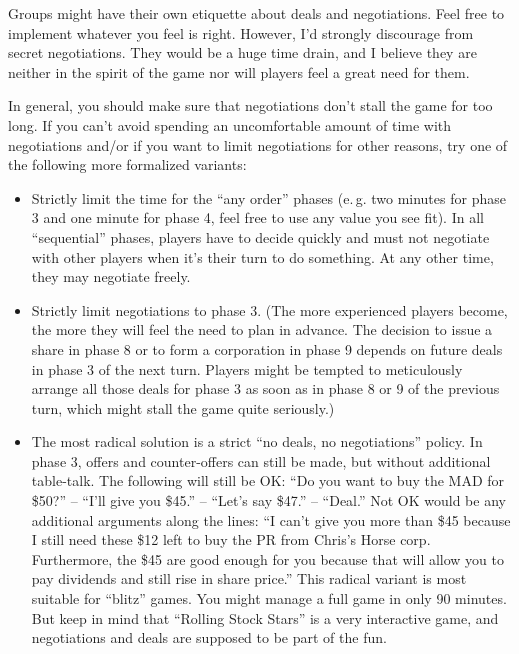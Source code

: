 \documentclass[10pt,final]{report}
\begin{document}
\begin{multicols}{2}
Groups might have their own etiquette about deals and
negotiations. Feel free to implement whatever you feel is right.
However, I'd strongly discourage from secret negotiations. They would
be a huge time drain, and I believe they are neither in the spirit of
the game nor will players feel a great need for them.

In general, you should make sure that negotiations don't stall the
game for too long. If you can't avoid spending
an uncomfortable amount of time with negotiations and/or if you want
to limit negotiations for other reasons, try one of the following more
formalized variants:

\begin{itemize}
\item Strictly limit the time for the ``any order'' phases (e.\,g. two
  minutes for phase 3 and one minute for phase 4, feel free to use any
  value you see fit). In all ``sequential'' phases, players have to
  decide quickly and must not negotiate with other players when it's
  their turn to do something. At any other time, they may negotiate
  freely.
\item Strictly limit negotiations to phase 3. (The more experienced
  players become, the more they will feel the need to plan in
  advance. The decision to issue a share in phase 8 or to form a
  corporation in phase 9 depends on future deals in phase 3 of the
  next turn. Players might be tempted to meticulously arrange all
  those deals for phase 3 as soon as in phase 8 or 9 of the previous
  turn, which might stall the game quite seriously.)
\item The most radical solution is a strict ``no deals, no
  negotiations'' policy. In phase 3, offers and counter-offers can
  still be made, but without additional table-talk. The following will
  still be OK: ``Do you want to buy the MAD for \$50?'' -- ``I'll give
  you \$45.'' -- ``Let's say \$47.'' -- ``Deal.'' Not OK would be any
  additional arguments along the lines: ``I can't give you more than
  \$45 because I still need these \$12 left to buy the PR from Chris's
  Horse corp. Furthermore, the \$45 are good enough for you because
  that will allow you to pay dividends and still rise in share
  price.'' This radical variant is most suitable for ``blitz''
  games. You might manage a full game in only 90 minutes. But keep in
  mind that ``Rolling Stock Stars'' is a very interactive game, and
  negotiations and deals are supposed to be part of the fun.
\end{itemize}


\end{multicols}
\end{document}
